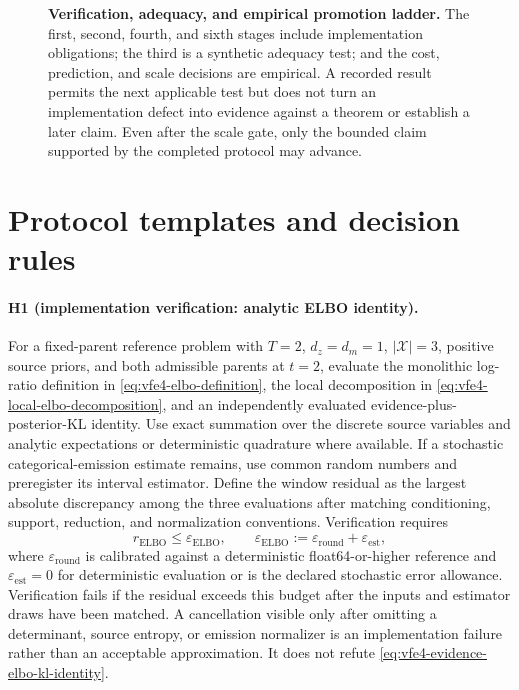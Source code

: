 \begin{figure}[htbp]
\centering
\resizebox{0.72\textwidth}{!}{}
\caption{%
\textbf{Verification, adequacy, and empirical promotion ladder.}
The first, second, fourth, and sixth stages include implementation obligations; the third is a synthetic adequacy test; and the cost, prediction, and scale decisions are empirical. A recorded result permits the next applicable test but does not turn an implementation defect into evidence against a theorem or establish a later claim. Even after the scale gate, only the bounded claim supported by the completed protocol may advance.
}
\label{fig:vfe4-validation-ladder}
\end{figure}
\clearpage

\section{Protocol templates and decision rules}

\paragraph{H1 (implementation verification: analytic ELBO identity).}
For a fixed-parent reference problem with $T=2$, $d_z=d_m=1$, $|\mathcal X|=3$, positive source priors, and both admissible parents at $t=2$, evaluate the monolithic log-ratio definition in \cref{eq:vfe4-elbo-definition}, the local decomposition in \cref{eq:vfe4-local-elbo-decomposition}, and an independently evaluated evidence-plus-posterior-KL identity. Use exact summation over the discrete source variables and analytic expectations or deterministic quadrature where available. If a stochastic categorical-emission estimate remains, use common random numbers and preregister its interval estimator. Define the window residual as the largest absolute discrepancy among the three evaluations after matching conditioning, support, reduction, and normalization conventions. Verification requires
\begin{equation}
r_{\mathrm{ELBO}}
\leq\varepsilon_{\mathrm{ELBO}},
\qquad
\varepsilon_{\mathrm{ELBO}}
:=\varepsilon_{\mathrm{round}}+\varepsilon_{\mathrm{est}},
\label{eq:h1-elbo-residual-threshold}
\end{equation}
where $\varepsilon_{\mathrm{round}}$ is calibrated against a deterministic float64-or-higher reference and $\varepsilon_{\mathrm{est}}=0$ for deterministic evaluation or is the declared stochastic error allowance. Verification fails if the residual exceeds this budget after the inputs and estimator draws have been matched. A cancellation visible only after omitting a determinant, source entropy, or emission normalizer is an implementation failure rather than an acceptable approximation. It does not refute \cref{eq:vfe4-evidence-elbo-kl-identity}.

